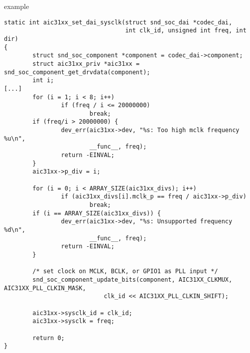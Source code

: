 \begin{frame}[fragile]{ example}
  \begin{block}{}
    \fontsize{7}{7}\selectfont
    \begin{verbatim}
static int aic31xx_set_dai_sysclk(struct snd_soc_dai *codec_dai,
                                  int clk_id, unsigned int freq, int dir)
{
        struct snd_soc_component *component = codec_dai->component;
        struct aic31xx_priv *aic31xx = snd_soc_component_get_drvdata(component);
        int i;
[...]
        for (i = 1; i < 8; i++)
                if (freq / i <= 20000000)
                        break;
        if (freq/i > 20000000) {
                dev_err(aic31xx->dev, "%s: Too high mclk frequency %u\n",
                        __func__, freq);
                return -EINVAL;
        }
        aic31xx->p_div = i;

        for (i = 0; i < ARRAY_SIZE(aic31xx_divs); i++)
                if (aic31xx_divs[i].mclk_p == freq / aic31xx->p_div)
                        break;
        if (i == ARRAY_SIZE(aic31xx_divs)) {
                dev_err(aic31xx->dev, "%s: Unsupported frequency %d\n",
                        __func__, freq);
                return -EINVAL;
        }

        /* set clock on MCLK, BCLK, or GPIO1 as PLL input */
        snd_soc_component_update_bits(component, AIC31XX_CLKMUX, AIC31XX_PLL_CLKIN_MASK,
                            clk_id << AIC31XX_PLL_CLKIN_SHIFT);

        aic31xx->sysclk_id = clk_id;
        aic31xx->sysclk = freq;

        return 0;
}
    \end{verbatim}
  \end{block}
\end{frame}

